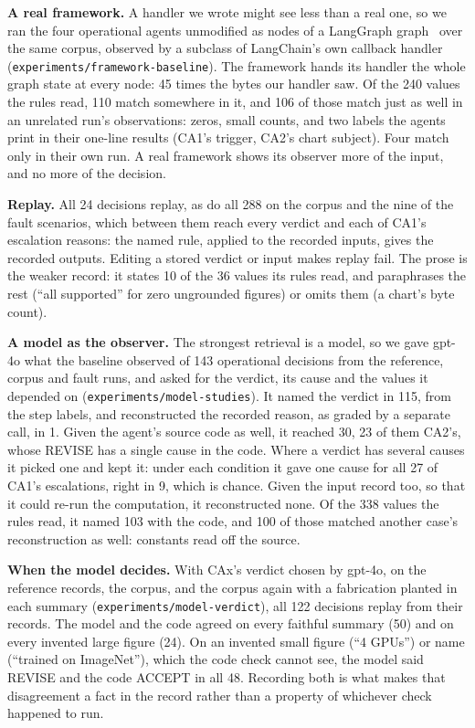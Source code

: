 \documentclass[conference]{IEEEtran}
\begin{document}
\noindent \textbf{A real framework.} A handler we wrote might see less than a real one, so we ran the four operational agents unmodified as nodes of a LangGraph graph~\cite{langgraph} over the same corpus, observed by a subclass of LangChain's own callback handler (\texttt{experiments/\allowbreak{}framework-baseline}). The framework hands its handler the whole graph state at every node: 45 times the bytes our handler saw. Of the 240 values the rules read, 110 match somewhere in it, and 106 of those match just as well in an unrelated run's observations: zeros, small counts, and two labels the agents print in their one-line results (CA1's trigger, CA2's chart subject). Four match only in their own run. A real framework shows its observer more of the input, and no more of the decision.

\noindent \textbf{Replay.} All 24 decisions replay, as do all 288 on the corpus and the nine of the fault scenarios, which between them reach every verdict and each of CA1's escalation reasons: the named rule, applied to the recorded inputs, gives the recorded outputs. Editing a stored verdict or input makes replay fail. The prose is the weaker record: it states 10 of the 36 values its rules read, and paraphrases the rest (``all supported'' for zero ungrounded figures) or omits them (a chart's byte count).

\noindent \textbf{A model as the observer.} The strongest retrieval is a model, so we gave gpt-4o what the baseline observed of 143 operational decisions from the reference, corpus and fault runs, and asked for the verdict, its cause and the values it depended on (\texttt{experiments/\allowbreak{}model-studies}). It named the verdict in 115, from the step labels, and reconstructed the recorded reason, as graded by a separate call, in 1. Given the agent's source code as well, it reached 30, 23 of them CA2's, whose REVISE has a single cause in the code. Where a verdict has several causes it picked one and kept it: under each condition it gave one cause for all 27 of CA1's escalations, right in 9, which is chance. Given the input record too, so that it could re-run the computation, it reconstructed none. Of the 338 values the rules read, it named 103 with the code, and 100 of those matched another case's reconstruction as well: constants read off the source.

\noindent \textbf{When the model decides.} With CAx's verdict chosen by gpt-4o, on the reference records, the corpus, and the corpus again with a fabrication planted in each summary (\texttt{experiments/\allowbreak{}model-verdict}), all 122 decisions replay from their records. The model and the code agreed on every faithful summary (50) and on every invented large figure (24). On an invented small figure (``4 GPUs'') or name (``trained on ImageNet''), which the code check cannot see, the model said REVISE and the code ACCEPT in all 48. Recording both is what makes that disagreement a fact in the record rather than a property of whichever check happened to run.
\end{document}
